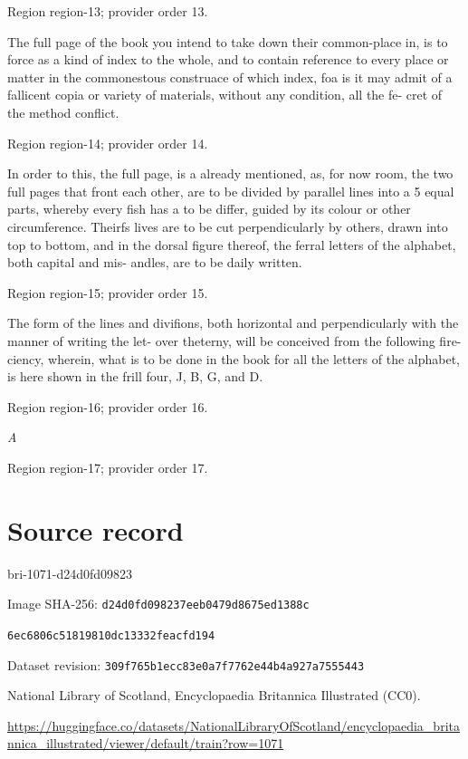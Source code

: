 \documentclass[11pt]{article}
\begin{document}
{\scriptsize\color{gray} Region region-13; provider order 13.\par}
\medskip

The full page of the book you intend to take down their common-place in, is to force as a kind of index to the whole, and to contain reference to every place or matter in the commonestous construace of which index, foa is it may admit of a fallicent copia or variety of materials, without any condition, all the fe- cret of the method conflict.
\par

{\scriptsize\color{gray} Region region-14; provider order 14.\par}
\medskip

In order to this, the full page, is a already mentioned, as, for now room, the two full pages that front each other, are to be divided by parallel lines into a 5 equal parts, whereby every fish has a to be differ, guided by its colour or other circumference. Theirfs lives are to be cut perpendicularly by others, drawn into top to bottom, and in the dorsal figure thereof, the ferral letters of the alphabet, both capital and mis- andles, are to be daily written.
\par

{\scriptsize\color{gray} Region region-15; provider order 15.\par}
\medskip

The form of the lines and divifions, both horizontal and perpendicularly with the manner of writing the let- over theterny, will be conceived from the following fire- ciency, wherein, what is to be done in the book for all the letters of the alphabet, is here shown in the frill four, J, B, G, and D.
\par

{\scriptsize\color{gray} Region region-16; provider order 16.\par}
\medskip

{\small\itshape A\par}

{\scriptsize\color{gray} Region region-17; provider order 17.\par}
\medskip
\newpage\section*{Source record}
bri-1071-d24d0fd09823\par
Image SHA-256: \texttt{d24d0fd098237eeb0479d8675ed1388c}\par\texttt{6ec6806c51819810dc13332feacfd194}\par
Dataset revision: \texttt{309f765b1ecc83e0a7f7}\texttt{762e44b4a927a7555443}\par
National Library of Scotland, Encyclopaedia Britannica Illustrated (CC0).\par
\url{https://huggingface.co/datasets/NationalLibraryOfScotland/encyclopaedia_britannica_illustrated/viewer/default/train?row=1071}
\end{document}

